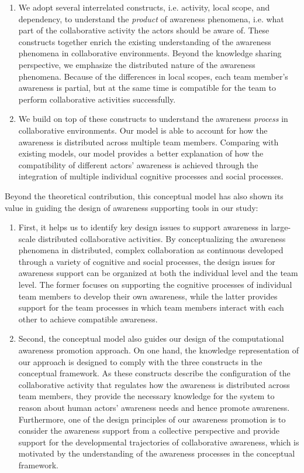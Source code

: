 \begin{enumerate}
	\item We adopt several interrelated constructs, i.e. activity, local scope, and dependency, to understand the \emph{product} of awareness phenomena, i.e. what part of the collaborative activity the actors should be aware of. These constructs together enrich the existing understanding of the awareness phenomena in collaborative environments. Beyond the knowledge sharing perspective, we emphasize the distributed nature of the awareness phenomena. Because of the differences in local scopes, each team member's awareness is partial, but at the same time is compatible for the team to perform collaborative activities successfully.
	\item We build on top of these constructs to understand the awareness \emph{process} in collaborative environments. Our model is able to account for how the awareness is distributed across multiple team members. Comparing with existing models, our model provides a better explanation of how the compatibility of different actors' awareness is achieved through the integration of multiple individual cognitive processes and social processes.
\end{enumerate}

Beyond the theoretical contribution, this conceptual model has also shown its value in guiding the design of awareness supporting tools in our study:

\begin{enumerate}
	\item First, it helps us to identify key design issues to support awareness in large-scale distributed collaborative activities. By conceptualizing the awareness phenomena in distributed, complex collaboration as continuous developed through a variety of cognitive and social processes, the design issues for awareness support can be organized at both the individual level and the team level. The former focuses on supporting the cognitive processes of individual team members to develop their own awareness, while the latter provides support for the team processes in which team members interact with each other to achieve compatible awareness.
	\item Second, the conceptual model also guides our design of the computational awareness promotion approach. On one hand, the knowledge representation of our approach is designed to comply with the three constructs in the conceptual framework. As these constructs describe the configuration of the collaborative activity that regulates how the awareness is distributed across team members, they provide the necessary knowledge for the system to reason about human actors' awareness needs and hence promote awareness. Furthermore, one of the design principles of our awareness promotion is to consider the awareness support from a collective perspective and provide support for the developmental trajectories of collaborative awareness, which is motivated by the understanding of the awareness processes in the conceptual framework.
\end{enumerate}

